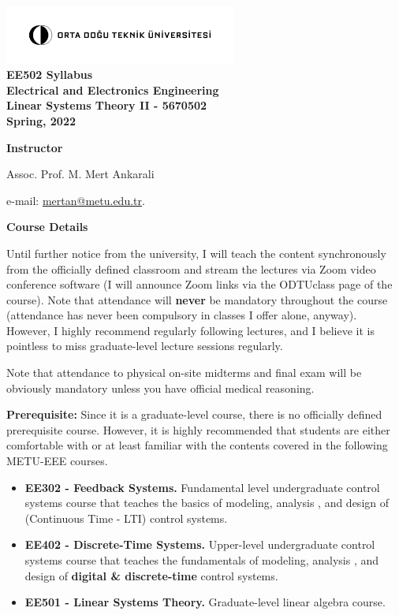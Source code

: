 \documentclass[11pt,oneside]{amsart}
\newcommand{\header}[1]{\bigbreak\textbf{#1}}
\begin{document}
\begin{center}
  \bf
  \includegraphics[width=3in]{metu_logo} \\
  EE502 Syllabus \\
 Electrical and Electronics Engineering \\ 
Linear Systems Theory II - 5670502 \\
Spring, 2022
\end{center}

\header{Instructor} 

\vspace{4pt}

Assoc. Prof. M. Mert Ankarali

e-mail: \url{mertan@metu.edu.tr}.

\header{Course Details}

\vspace{6pt}

Until further notice from the university, I will teach the content
synchronously from the officially defined classroom and stream the
lectures via Zoom video conference software (I will announce Zoom
links via the ODTUclass page of the course). Note that attendance will
\textbf{never} be mandatory throughout the course (attendance has
never been compulsory in classes I offer alone, anyway). However,  I
highly recommend regularly following lectures, and I believe it is
pointless to miss graduate-level lecture sessions regularly. 

\vspace{3pt}

Note that attendance to physical on-site midterms and final exam will
be obviously mandatory unless you have official medical reasoning. 

\vspace{6pt}

\textbf{Prerequisite:} Since it is a graduate-level course, there is no officially defined prerequisite course. However, it is highly recommended that students are either comfortable with or at least familiar with the contents covered in the following METU-EEE courses.


\begin{itemize}
  \item \textbf{EE302 - Feedback Systems.} Fundamental level undergraduate control
    systems course that teaches the basics of modeling, analysis
    , and design of (Continuous Time - LTI) control systems. 
   \item \textbf{EE402 - Discrete-Time Systems.} Upper-level undergraduate control
    systems course that teaches the fundamentals of modeling, analysis
    , and design of \textbf{digital \& discrete-time} control systems. 
   \item \textbf{EE501 - Linear Systems Theory.} Graduate-level linear algebra course.
\end{itemize}
\end{document}
